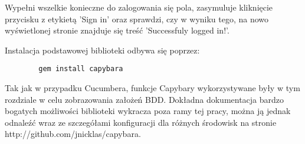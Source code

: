       
      
      Wypełni wszelkie konieczne do zalogowania się pola, zasymuluje kliknięcie przycisku z etykietą 'Sign in' oraz sprawdzi, czy w wyniku tego, na nowo wyświetlonej stronie znajduje się treść 'Successfuly logged in!'.
      
      Instalacja podstawowej biblioteki odbywa się poprzez:
      
      \begin{lstlisting}
        gem install capybara
      \end{lstlisting}
      
      Tak jak w przypadku Cucumbera, funkcje Capybary wykorzystywane były w tym rozdziale w celu zobrazowania założeń BDD. Dokładna dokumentacja bardzo bogatych możliwości biblioteki wykracza poza ramy tej pracy, można ją jednak odnaleźć wraz ze szczegółami konfiguracji dla różnych środowisk na stronie http://github.com/jnicklas/capybara.
      